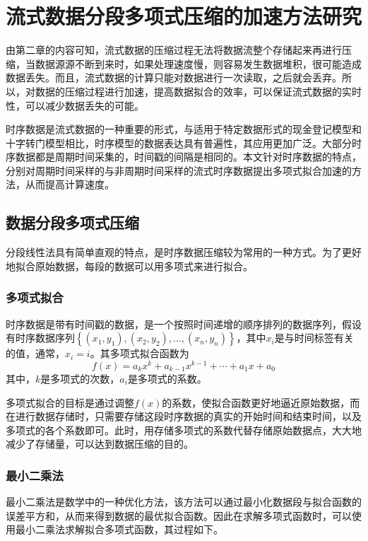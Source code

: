 \chapter{流式数据分段多项式压缩的加速方法研究}
\label{chap:intro}
由第二章的内容可知，流式数据的压缩过程无法将数据流整个存储起来再进行压缩，当数据源源不断到来时，如果处理速度慢，则容易发生数据堆积，很可能造成数据丢失。而且，流式数据的计算只能对数据进行一次读取，之后就会丢弃。所以，对数据的压缩过程进行加速，提高数据拟合的效率，可以保证流式数据的实时性，可以减少数据丢失的可能。

时序数据是流式数据的一种重要的形式，与适用于特定数据形式的现金登记模型和十字转门模型相比，时序模型的数据表达具有普遍性，其应用更加广泛。大部分时序数据都是周期时间采集的，时间戳的间隔是相同的。本文针对时序数据的特点，分别对周期时间采样的与非周期时间采样的流式时序数据提出多项式拟合加速的方法，从而提高计算速度。

\section{数据分段多项式压缩}
分段线性法具有简单直观的特点，是时序数据压缩较为常用的一种方式。为了更好地拟合原始数据，每段的数据可以用多项式来进行拟合。

\subsection{多项式拟合}
时序数据是带有时间戳的数据，是一个按照时间递增的顺序排列的数据序列，假设有时序数据序列$\left \{ \left ( x_{1},y_{1} \right ),\left ( x_{2},y_{2} \right ),...,\left ( x_{n},y_{n} \right ) \right \}$，其中$x_{i}$是与时间标签有关的值，通常，$x_{i} = i$。其多项式拟合函数为
\begin{equation}f(x)=a_kx^k+a_{k-1}x^{k-1}+\cdots+a_1x+a_0 \label{equ:ECS} \end{equation}
其中，$k$是多项式的次数，$a_i$是多项式的系数。

多项式拟合的目标是通过调整$f(x)$的系数，使拟合函数更好地逼近原始数据，而在进行数据存储时，只需要存储这段时序数据的真实的开始时间和结束时间，以及多项式的各个系数即可。此时，用存储多项式的系数代替存储原始数据点，大大地减少了存储量，可以达到数据压缩的目的。

\subsection{最小二乘法}
最小二乘法是数学中的一种优化方法，该方法可以通过最小化数据段与拟合函数的误差平方和，从而来得到数据的最优拟合函数。因此在求解多项式函数时，可以使用最小二乘法求解拟合多项式函数，其过程如下。

